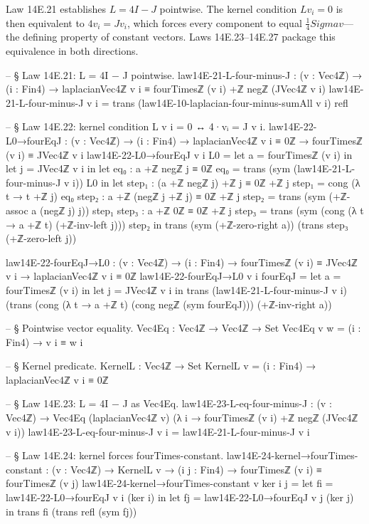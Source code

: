 \documentclass[11pt,a4paper]{book}
\def\Sigma{Sigma}%
\begin{document}
Law 14E.21 establishes $L = 4I - J$ pointwise.
The kernel condition $Lv_i = 0$ is then equivalent to $4 v_i = Jv_i$, which forces every component to equal $\tfrac{1}{4} \Sigma v$---the defining property of constant vectors.
Laws 14E.23--14E.27 package this equivalence in both directions.

\begin{code}
-- § Law 14E.21: L = 4I − J pointwise.
law14E-21-L-four-minus-J : (v : Vec4ℤ) → (i : Fin4) →
  laplacianVec4ℤ v i ≡ fourTimesℤ (v i) +ℤ negℤ (JVec4ℤ v i)
law14E-21-L-four-minus-J v i =
  trans (law14E-10-laplacian-four-minus-sumAll v i) refl

-- § Law 14E.22: kernel condition L v i = 0 ↔ 4·vᵢ = J v i.
law14E-22-L0→fourEqJ : (v : Vec4ℤ) → (i : Fin4) → laplacianVec4ℤ v i ≡ 0ℤ →
  fourTimesℤ (v i) ≡ JVec4ℤ v i
law14E-22-L0→fourEqJ v i L0 =
  let a = fourTimesℤ (v i) in
  let j = JVec4ℤ v i in
  let eq₀ : a +ℤ negℤ j ≡ 0ℤ
      eq₀ = trans (sym (law14E-21-L-four-minus-J v i)) L0
  in
  let step₁ : (a +ℤ negℤ j) +ℤ j ≡ 0ℤ +ℤ j
      step₁ = cong (λ t → t +ℤ j) eq₀
      step₂ : a +ℤ (negℤ j +ℤ j) ≡ 0ℤ +ℤ j
      step₂ = trans (sym (+ℤ-assoc a (negℤ j) j)) step₁
      step₃ : a +ℤ 0ℤ ≡ 0ℤ +ℤ j
      step₃ = trans (sym (cong (λ t → a +ℤ t) (+ℤ-inv-left j))) step₂
  in
  trans
    (sym (+ℤ-zero-right a))
    (trans step₃ (+ℤ-zero-left j))

law14E-22-fourEqJ→L0 : (v : Vec4ℤ) → (i : Fin4) → fourTimesℤ (v i) ≡ JVec4ℤ v i →
  laplacianVec4ℤ v i ≡ 0ℤ
law14E-22-fourEqJ→L0 v i fourEqJ =
  let a = fourTimesℤ (v i) in
  let j = JVec4ℤ v i in
  trans
    (law14E-21-L-four-minus-J v i)
    (trans
      (cong (λ t → a +ℤ t) (cong negℤ (sym fourEqJ)))
      (+ℤ-inv-right a))

-- § Pointwise vector equality.
Vec4Eq : Vec4ℤ → Vec4ℤ → Set
Vec4Eq v w = (i : Fin4) → v i ≡ w i

-- § Kernel predicate.
KernelL : Vec4ℤ → Set
KernelL v = (i : Fin4) → laplacianVec4ℤ v i ≡ 0ℤ

-- § Law 14E.23: L = 4I − J as Vec4Eq.
law14E-23-L-eq-four-minus-J : (v : Vec4ℤ) →
  Vec4Eq (laplacianVec4ℤ v) (λ i → fourTimesℤ (v i) +ℤ negℤ (JVec4ℤ v i))
law14E-23-L-eq-four-minus-J v i = law14E-21-L-four-minus-J v i

-- § Law 14E.24: kernel forces fourTimes-constant.
law14E-24-kernel→fourTimes-constant : (v : Vec4ℤ) → KernelL v → (i j : Fin4) →
  fourTimesℤ (v i) ≡ fourTimesℤ (v j)
law14E-24-kernel→fourTimes-constant v ker i j =
  let fi = law14E-22-L0→fourEqJ v i (ker i) in
  let fj = law14E-22-L0→fourEqJ v j (ker j) in
  trans fi (trans refl (sym fj))


\end{code}
\end{document}
